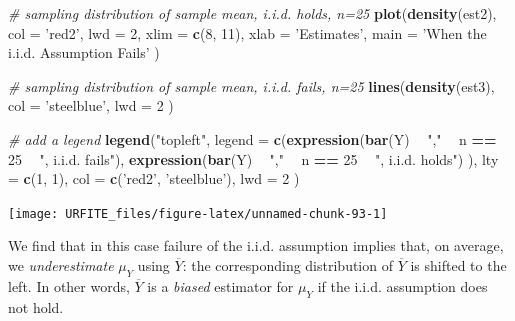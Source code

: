 \documentclass[]{book}
\newenvironment{Shaded}{\begin{snugshade}}{\end{snugshade}}
\newcommand{\KeywordTok}[1]{\textcolor[rgb]{0.13,0.29,0.53}{\textbf{#1}}}
\newcommand{\DataTypeTok}[1]{\textcolor[rgb]{0.13,0.29,0.53}{#1}}
\newcommand{\DecValTok}[1]{\textcolor[rgb]{0.00,0.00,0.81}{#1}}
\newcommand{\StringTok}[1]{\textcolor[rgb]{0.31,0.60,0.02}{#1}}
\newcommand{\CommentTok}[1]{\textcolor[rgb]{0.56,0.35,0.01}{\textit{#1}}}
\newcommand{\OperatorTok}[1]{\textcolor[rgb]{0.81,0.36,0.00}{\textbf{#1}}}
\newcommand{\NormalTok}[1]{#1}
\theoremstyle{definition}
\theoremstyle{definition}
\theoremstyle{definition}
\theoremstyle{remark}
\begin{document}
\begin{Shaded}
\begin{Highlighting}[]
\CommentTok{# sampling distribution of sample mean, i.i.d. holds, n=25}
\KeywordTok{plot}\NormalTok{(}\KeywordTok{density}\NormalTok{(est2), }
      \DataTypeTok{col =} \StringTok{'red2'}\NormalTok{,}
      \DataTypeTok{lwd =} \DecValTok{2}\NormalTok{,}
      \DataTypeTok{xlim =} \KeywordTok{c}\NormalTok{(}\DecValTok{8}\NormalTok{, }\DecValTok{11}\NormalTok{),}
      \DataTypeTok{xlab =} \StringTok{'Estimates'}\NormalTok{,}
      \DataTypeTok{main =} \StringTok{'When the i.i.d. Assumption Fails'}
\NormalTok{     )}

\CommentTok{# sampling distribution of sample mean, i.i.d. fails, n=25}
\KeywordTok{lines}\NormalTok{(}\KeywordTok{density}\NormalTok{(est3),}
      \DataTypeTok{col =} \StringTok{'steelblue'}\NormalTok{,}
      \DataTypeTok{lwd =} \DecValTok{2}
\NormalTok{      )}

\CommentTok{# add a legend}
\KeywordTok{legend}\NormalTok{(}\StringTok{"topleft"}\NormalTok{,}
       \DataTypeTok{legend =} \KeywordTok{c}\NormalTok{(}\KeywordTok{expression}\NormalTok{(}\KeywordTok{bar}\NormalTok{(Y) }\OperatorTok{~}\StringTok{ ","} \OperatorTok{~}\StringTok{ }\NormalTok{n }\OperatorTok{==}\StringTok{ }\DecValTok{25} \OperatorTok{~}\StringTok{ ", i.i.d. fails"}\NormalTok{),}
                  \KeywordTok{expression}\NormalTok{(}\KeywordTok{bar}\NormalTok{(Y) }\OperatorTok{~}\StringTok{ ","} \OperatorTok{~}\StringTok{ }\NormalTok{n }\OperatorTok{==}\StringTok{ }\DecValTok{25} \OperatorTok{~}\StringTok{ ", i.i.d. holds"}\NormalTok{)}
\NormalTok{                  ), }
       \DataTypeTok{lty =} \KeywordTok{c}\NormalTok{(}\DecValTok{1}\NormalTok{, }\DecValTok{1}\NormalTok{), }
       \DataTypeTok{col =} \KeywordTok{c}\NormalTok{(}\StringTok{'red2'}\NormalTok{, }\StringTok{'steelblue'}\NormalTok{),}
       \DataTypeTok{lwd =} \DecValTok{2}
\NormalTok{       )}
\end{Highlighting}
\end{Shaded}

\begin{center}\texttt{[image: URFITE\_files/figure-latex/unnamed-chunk-93-1]} \end{center}

We find that in this case failure of the i.i.d. assumption implies that,
on average, we \emph{underestimate} \(\mu_Y\) using \(\overline{Y}\):
the corresponding distribution of \(\overline{Y}\) is shifted to the
left. In other words, \(\overline{Y}\) is a \emph{biased} estimator for
\(\mu_Y\) if the i.i.d. assumption does not hold.
\end{document}

